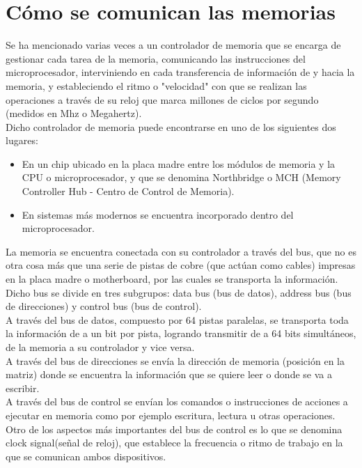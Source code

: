 \documentclass{article}
\begin{document}
\section*{Cómo se comunican las memorias}
Se ha mencionado varias veces a un controlador de memoria que se encarga de gestionar cada
tarea de la memoria, comunicando las instrucciones del microprocesador, interviniendo en
cada transferencia de información de y hacia la memoria, y estableciendo el ritmo o "velocidad"
con que se realizan las operaciones a través de su reloj que marca millones de ciclos por
segundo (medidos en Mhz o Megahertz).\\[0.1cm]
Dicho controlador de memoria puede encontrarse en uno de los siguientes dos lugares:
\begin{itemize}
\item En un chip ubicado en la placa madre entre los módulos de memoria y la CPU o
microprocesador, y que se denomina Northbridge o MCH (Memory Controller Hub -
Centro de Control de Memoria).
\item En sistemas más modernos se encuentra incorporado dentro del microprocesador.
\end{itemize}
La memoria se encuentra conectada con su controlador a través del bus, que no es otra cosa
más que una serie de pistas de cobre (que actúan como cables) impresas en la placa madre o
motherboard, por las cuales se transporta la información. Dicho bus se divide en tres
subgrupos: data bus (bus de datos), address bus (bus de direcciones) y control bus (bus de
control).\\[0.1cm]
A través del bus de datos, compuesto por 64 pistas paralelas, se transporta toda la información
de a un bit por pista, logrando transmitir de a 64 bits simultáneos, de la memoria a su
controlador y vice versa.\\[0.1cm]
A través del bus de direcciones se envía la dirección de memoria (posición en la matriz) donde
se encuentra la información que se quiere leer o donde se va a escribir.\\[0.1cm]
A través del bus de control se envían los comandos o instrucciones de acciones a ejecutar en
memoria como por ejemplo escritura, lectura u otras operaciones. Otro de los aspectos más
importantes del bus de control es lo que se denomina clock signal(señal de reloj), que establece
la frecuencia o ritmo de trabajo en la que se comunican ambos dispositivos.
\end{document}
